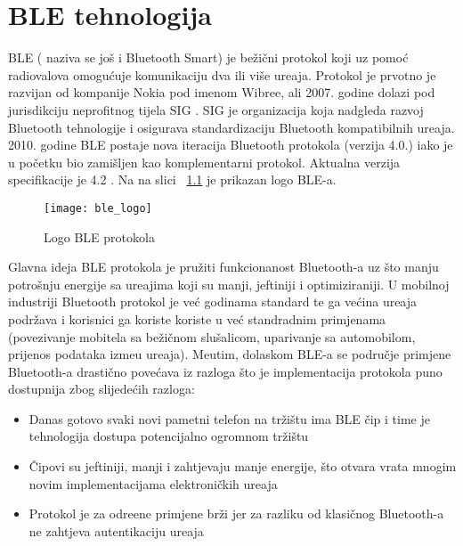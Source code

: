 \chapter{BLE tehnologija}
BLE ( naziva se jo\v{s} i Bluetooth Smart) je be\v{z}i\v{c}ni protokol koji uz pomo\'{c} radiovalova omogu\'{c}uje komunikaciju dva ili vi\v{s}e ure\dj aja. Protokol je prvotno je razvijan od kompanije Nokia pod imenom Wibree, ali 2007. godine dolazi pod jurisdikciju neprofitnog tijela SIG \cite{sig}. SIG je organizacija koja nadgleda razvoj Bluetooth tehnologije i osigurava standardizaciju Bluetooth kompatibilnih ure\dj aja. 2010. godine BLE postaje nova iteracija Bluetooth protokola (verzija 4.0.) iako je u po\v{c}etku bio zami\v{s}ljen kao komplementarni protokol. Aktualna verzija specifikacije je 4.2 \cite{ble_specification}. Na na slici ~\ref{fig:ble} je prikazan logo BLE-a.

\begin{figure}[!htbp]
	\begin{center}
 \texttt{[image: ble\_logo]}
 \caption{Logo BLE protokola}
 \label{fig:ble}
	\end{center}
\end{figure}

Glavna ideja BLE protokola je pru\v{z}iti funkcionanost Bluetooth-a uz \v{s}to manju potro\v{s}nju energije sa ure\dj ajima koji su manji, jeftiniji i optimiziraniji. U mobilnoj industriji Bluetooth protokol je ve\'{c} godinama standard te ga ve\'{c}ina ure\dj aja podr\v{z}ava i korisnici ga koriste koriste u ve\'{c} standradnim primjenama (povezivanje mobitela sa be\v{z}i\v{c}nom slu\v{s}alicom, uparivanje sa automobilom, prijenos podataka izme\dj u ure\dj aja). Me\dj utim, dolaskom BLE-a se podru\v{c}je primjene Bluetooth-a drasti\v{c}no pove\'{c}ava iz razloga \v{s}to je implementacija protokola puno dostupnija zbog slijede\'{c}ih razloga:

\begin{itemize}
	\item Danas gotovo svaki novi pametni telefon na tr\v{z}i\v{s}tu ima BLE \v{c}ip i time je tehnologija dostupa potencijalno ogromnom tr\v{z}i\v{s}tu
	\item \v{C}ipovi su jeftiniji, manji i zahtjevaju manje energije, \v{s}to otvara vrata mnogim novim implementacijama elektroni\v{c}kih ure\dj aja
	\item Protokol je za odre\dj ene primjene br\v{z}i jer za razliku od klasi\v{c}nog Bluetooth-a ne zahtjeva autentikaciju ure\dj aja
\end{itemize}


